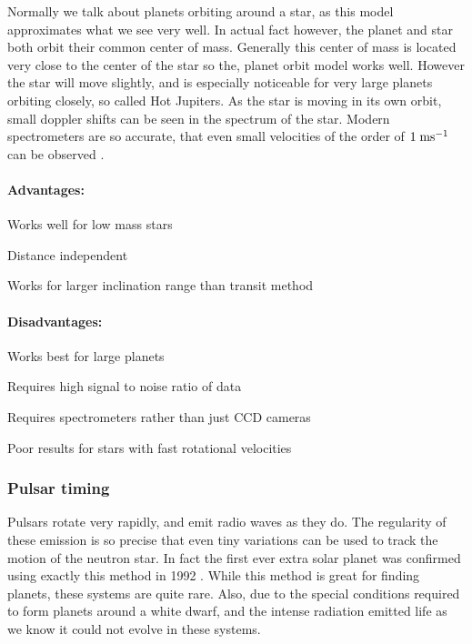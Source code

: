 Normally we talk about planets orbiting around a star, as this model approximates what we see very well. In actual fact however, the planet and star both orbit their common center of mass. Generally this center of mass is located very close to the center of the star so the, planet orbit model works well. However the star will move slightly, and is especially noticeable for very large planets orbiting closely, so called Hot Jupiters. As the star is moving in its own orbit, small doppler shifts can be seen in the spectrum of the star. Modern spectrometers are so accurate, that even small velocities of the order of $1\;\mathrm{ms^{-1}}$ can be observed \citep{ge2002externally}.

\paragraph{Advantages:}
\begin{itemize*}
    \item Works well for low mass stars
    \item Distance independent
    \item Works for larger inclination range than transit method
\end{itemize*}

\paragraph{Disadvantages:}
\begin{itemize*}
    \item Works best for large planets
    \item Requires high signal to noise ratio of data
    \item Requires spectrometers rather than just CCD cameras
    \item Poor results for stars with fast rotational velocities
\end{itemize*}

\subsubsection{Pulsar timing}

Pulsars rotate very rapidly, and emit radio waves as they do. The regularity of these emission is so precise that even tiny variations can be used to track the motion of the neutron star. In fact the first ever extra solar planet was confirmed using exactly this method in 1992 \citep{wolszczan1992planetary}. While this method is great for finding planets, these systems are quite rare. Also, due to the special conditions required to form planets around a white dwarf, and the intense radiation emitted life as we know it could not evolve in these systems.

